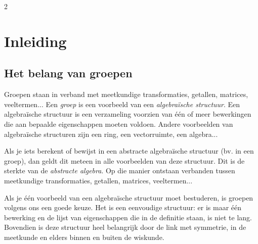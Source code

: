 

\startcontents[inhoudloep]	%

\begin{multicols}{2}
	
	\inhoudstafelloep			%
	
	\section{Inleiding}
	
	\subsection*{Het belang van groepen}
	
	Groepen staan in verband met meetkundige transformaties, getallen, matrices, veeltermen... Een \emph{groep} is een voorbeeld van een \emph{algebraïsche structuur}. Een algebraïsche structuur is een verzameling voorzien van één of meer bewerkingen die aan bepaalde eigenschappen moeten voldoen. Andere voorbeelden van algebraïsche structuren zijn een ring, een vectorruimte, een algebra... 
	
	Als je iets berekent of bewijst in een abstracte algebraïsche structuur (bv. in een groep), dan geldt dit meteen in alle voorbeelden van deze structuur. Dit is de sterkte van de \emph{abstracte algebra}. Op die manier ontstaan verbanden tussen meetkundige transformaties, getallen, matrices, veeltermen...
	
	Als je één voorbeeld van een algebraïsche structuur moet bestuderen, is groepen volgens ons een goede keuze. Het is een eenvoudige structuur: er is maar één bewerking en de lijst van eigenschappen die in de definitie staan, is niet te lang. Bovendien is deze structuur heel belangrijk door de link met symmetrie, in de meetkunde en elders binnen en buiten de wiskunde.
	

\end{multicols}
